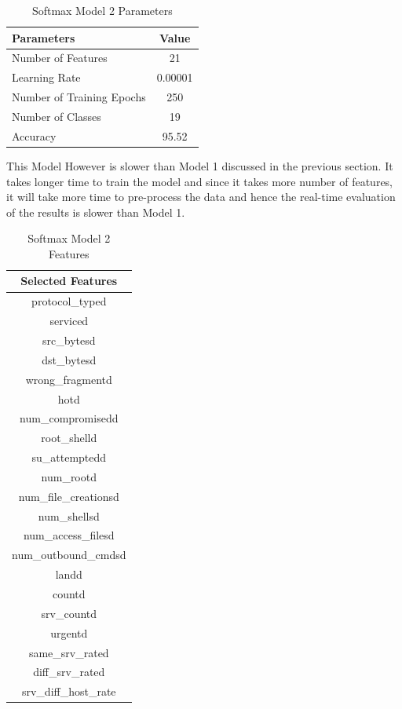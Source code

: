 \documentclass[12pt]{article}
\theoremstyle{definition}
\begin{document}
		\begin{table}[h!]
			\centering
			\caption{Softmax Model 2 Parameters}
			\label{tab:model-2-params}
			\begin{tabular}{|l|c|}
				\hline
				\bfseries{Parameters} & \textbf{Value} \\ \hline
				Number of Features & 21 \\
				Learning Rate & 0.00001 \\
				Number of Training Epochs & 250 \\
				Number of Classes & 19 \\ 
				Accuracy & 95.52 \\
				\hline	
			\end{tabular}
			
		\end{table}
		This Model However is slower than Model 1 discussed in the previous section. It takes longer time to train the model and since it takes more number of features, it will take more time to pre-process the data and hence the real-time evaluation of the results is slower than Model 1.
		\begin{table}[h!]
			\centering
			\caption{Softmax Model 2 Features}
			\label{tab:model-2-features}
			\begin{tabular}{|c|}
				\hline
				\bfseries{Selected Features} \\ \hline
					protocol\_typed \\
					serviced \\
					src\_bytesd \\
					dst\_bytesd \\
					wrong\_fragmentd \\
					hotd \\
					num\_compromisedd \\
					root\_shelld \\
					su\_attemptedd \\
					num\_rootd \\
					num\_file\_creationsd \\
					num\_shellsd \\
					num\_access\_filesd \\
					num\_outbound\_cmdsd \\
					landd \\
					countd \\
					srv\_countd \\
					urgentd \\
					same\_srv\_rated \\
					diff\_srv\_rated \\
					srv\_diff\_host\_rate\\
				\hline	
			\end{tabular}
		\end{table}
	
\end{document}
